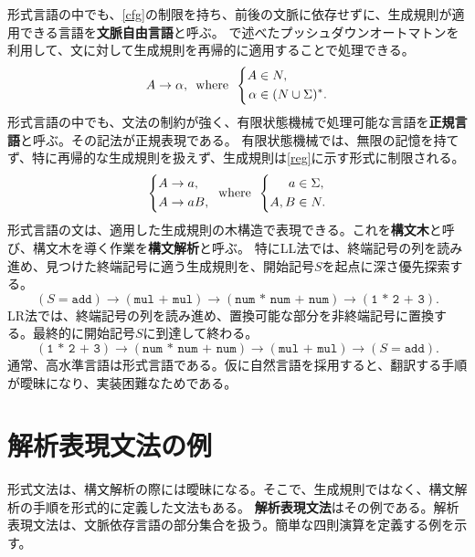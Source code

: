 \documentclass[10pt,a4paper]{book}
\begin{document}
%
形式言語の中でも、\eqref{cfg}の制限を持ち、前後の文脈に依存せずに、生成規則が適用できる言語を\textbf{文脈自由言語}と呼ぶ。
で述べたプッシュダウンオートマトンを利用して、文に対して生成規則を再帰的に適用することで処理できる。
%
\begin{equation}
\label{eq:cfg}
A \to \alpha,
\enspace\mathrm{where}\enspace
\left\{
\begin{aligned}
A &\in N,\\
\alpha &\in (N\cup\Sigma)^*.
\end{aligned}
\right.
\end{equation}
%
形式言語の中でも、文法の制約が強く、有限状態機械で処理可能な言語を\textbf{正規言語}と呼ぶ。その記法が正規表現である。
有限状態機械では、無限の記憶を持てず、特に再帰的な生成規則を扱えず、生成規則は\eqref{reg}に示す形式に制限される。
%
\begin{equation}
\label{eq:reg}
\left\{
\begin{aligned}
A &\to a,\\
A &\to aB,
\end{aligned}
\right.
\enspace\mathrm{where}\enspace
\left\{
\begin{aligned}
a &\in \Sigma,\\
A,B &\in N.
\end{aligned}
\right.
\end{equation}
%
形式言語の文は、適用した生成規則の木構造で表現できる。これを\textbf{構文木}と呼び、構文木を導く作業を\textbf{構文解析}と呼ぶ。
特にLL法では、終端記号の列を読み進め、見つけた終端記号に適う生成規則を、開始記号$S$を起点に深さ優先探索する。
%
\begin{equation}
(S=\texttt{add})\to(\texttt{mul + mul})\to(\texttt{num * num + num})\to(\texttt{1 * 2 + 3}).
\end{equation}
%
LR法では、終端記号の列を読み進め、置換可能な部分を非終端記号に置換する。最終的に開始記号$S$に到達して終わる。
%
\begin{equation}
(\texttt{1 * 2 + 3})\to(\texttt{num * num + num})\to(\texttt{mul + mul})\to(S=\texttt{add}).
\end{equation}
%
通常、高水準言語は形式言語である。仮に自然言語を採用すると、翻訳する手順が曖昧になり、実装困難なためである。

\section{解析表現文法の例\label{sect:PEG}}

形式文法は、構文解析の際には曖昧になる。そこで、生成規則ではなく、構文解析の手順を形式的に定義した文法もある。
\textbf{解析表現文法}はその例である。解析表現文法は、文脈依存言語の部分集合を扱う。簡単な四則演算を定義する例を示す。
\end{document}
